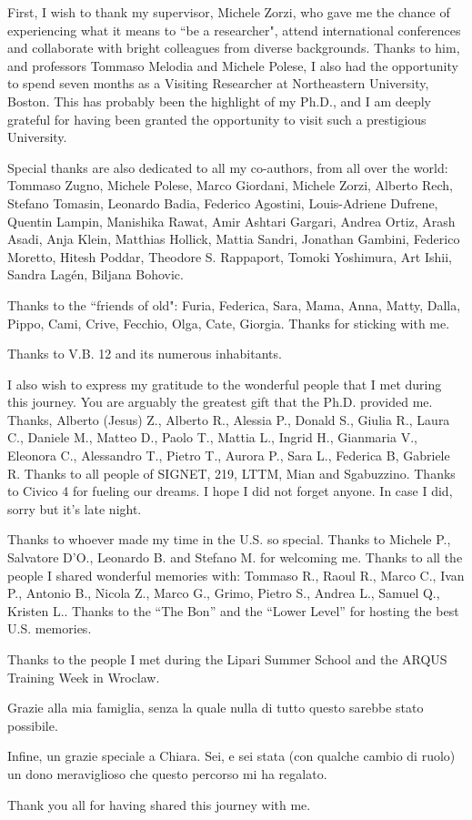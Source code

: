 \small

First, I wish to thank my supervisor, Michele Zorzi, who gave me the chance of experiencing what it means to ``be a researcher", attend international conferences and collaborate with bright colleagues from diverse backgrounds.
Thanks to him, and professors Tommaso Melodia and Michele Polese, I also had the opportunity to spend seven
months as a Visiting Researcher at Northeastern University, Boston. This has probably been the highlight of my Ph.D., and I am deeply grateful for having been granted the opportunity to visit such a prestigious University.

Special thanks are also dedicated to all my co-authors, from all over the world:
Tommaso Zugno, Michele Polese, Marco Giordani, Michele Zorzi,
Alberto Rech, Stefano Tomasin, Leonardo Badia, Federico Agostini, Louis-Adriene Dufrene, Quentin Lampin, Manishika Rawat,
Amir Ashtari Gargari, Andrea Ortiz, Arash Asadi, Anja Klein, Matthias Hollick,
Mattia Sandri,
Jonathan Gambini, Federico Moretto,
Hitesh Poddar, Theodore S. Rappaport, Tomoki Yoshimura, Art Ishii,
Sandra Lagén, Biljana Bohovic.

Thanks to the ``friends of old": Furia, Federica, Sara, Mama, Anna, Matty, Dalla, Pippo, Cami, Crive, Fecchio, Olga, Cate, Giorgia. Thanks for sticking with me.

Thanks to V.B. 12 and its numerous inhabitants.

I also wish to express my gratitude to the wonderful people that I met during this journey.
You are arguably the greatest gift that the Ph.D. provided me. 
Thanks, Alberto (Jesus) Z., Alberto R., Alessia P., Donald S., Giulia R., Laura C., Daniele M., Matteo D., Paolo T., Mattia L., Ingrid H., Gianmaria V., Eleonora C., Alessandro T., Pietro T., Aurora P., Sara L., Federica B, Gabriele R.
Thanks to all people of SIGNET, 219, LTTM, Mian and Sgabuzzino.
Thanks to Civico 4 for fueling our dreams.
I hope I did not forget anyone. In case I did, sorry but it's late night.

Thanks to whoever made my time in the U.S. so special. Thanks to Michele P., Salvatore D'O., Leonardo B. and Stefano M. for welcoming me.
Thanks to all the people I shared wonderful memories with: Tommaso R., Raoul R., Marco C., Ivan P., Antonio B., Nicola Z., Marco G., Grimo, Pietro S., Andrea L., Samuel Q., Kristen L..
Thanks to the ``The Bon'' and the ``Lower Level'' for hosting the best U.S. memories.

Thanks to the people I met during the Lipari Summer School and the ARQUS Training Week in Wroclaw.

Grazie alla mia famiglia, senza la quale nulla di tutto questo sarebbe stato possibile.

Infine, un grazie speciale a Chiara. Sei, e sei stata (con qualche cambio di ruolo) un dono meraviglioso che questo percorso mi ha regalato.

\normalsize
Thank you all for having shared this journey with me.